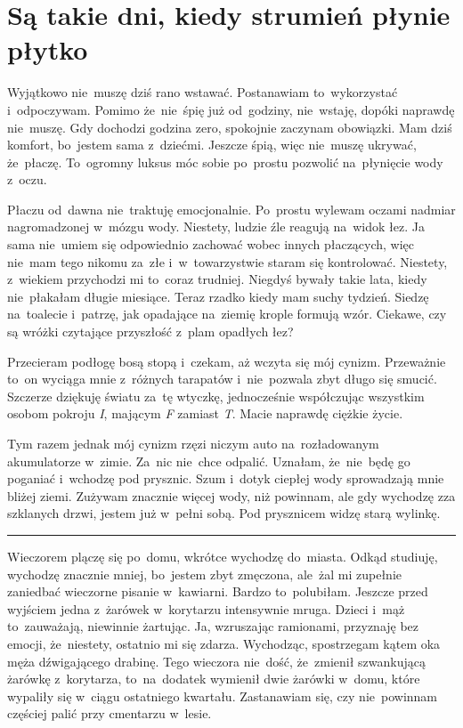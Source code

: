 \documentclass[9pt, a5paper]{memoir}
\begin{document}
\newpage
\section{Są takie dni, kiedy strumień płynie płytko}
Wyjątkowo nie~muszę dziś rano wstawać. Postanawiam to~wykorzystać i~odpoczywam. Pomimo że~nie~śpię już od~godziny, nie~wstaję, dopóki naprawdę nie~muszę. Gdy dochodzi godzina zero, spokojnie zaczynam obowiązki. Mam dziś komfort, bo~jestem sama z~dziećmi. Jeszcze śpią, więc nie~muszę ukrywać, że~płaczę. To~ogromny luksus móc sobie po~prostu pozwolić na~płynięcie wody z~oczu.

Płaczu od~dawna nie~traktuję emocjonalnie. Po~prostu wylewam oczami nadmiar nagromadzonej w~mózgu wody. Niestety, ludzie źle reagują na~widok łez. Ja sama nie~umiem się odpowiednio zachować wobec innych płaczących, więc nie~mam tego nikomu za~złe i~w~towarzystwie staram się kontrolować. Niestety, z~wiekiem przychodzi mi to~coraz trudniej. Niegdyś bywały takie lata, kiedy nie~płakałam długie miesiące. Teraz rzadko kiedy mam suchy tydzień.
Siedzę na~toalecie i~patrzę, jak opadające na~ziemię krople formują wzór. Ciekawe, czy są wróżki czytające przyszłość z~plam opadłych łez?

Przecieram podłogę bosą stopą i~czekam, aż wczyta się mój cynizm. Przeważnie to~on wyciąga mnie z~różnych tarapatów i~nie~pozwala zbyt długo się smucić. Szczerze dziękuję światu za~tę wtyczkę, jednocześnie współczując wszystkim osobom pokroju \textit{I}, mającym \textit{F} zamiast \textit{T}. Macie naprawdę ciężkie życie.

Tym razem jednak mój cynizm rzęzi niczym auto na~rozładowanym akumulatorze w~zimie. Za~nic nie~chce odpalić. Uznałam, że~nie~będę go poganiać i~wchodzę pod prysznic. Szum i~dotyk ciepłej wody sprowadzają mnie bliżej ziemi. Zużywam znacznie więcej wody, niż powinnam, ale gdy wychodzę zza szklanych drzwi, jestem już w~pełni sobą. Pod prysznicem widzę starą wylinkę.

\fancybreak{* \quad * \quad *}

Wieczorem plączę się po~domu, wkrótce wychodzę do~miasta. Odkąd studiuję, wychodzę znacznie mniej, bo~jestem zbyt zmęczona, ale~żal mi zupełnie zaniedbać wieczorne pisanie w~kawiarni. Bardzo to~polubiłam. Jeszcze przed wyjściem jedna z~żarówek w~korytarzu intensywnie mruga. Dzieci i~mąż to~zauważają, niewinnie żartując. Ja, wzruszając ramionami, przyznaję bez emocji, że~niestety, ostatnio mi się zdarza. Wychodząc, spostrzegam kątem oka męża dźwigającego drabinę. Tego wieczora nie~dość, że~zmienił szwankującą żarówkę z~korytarza, to~na~dodatek wymienił dwie żarówki w~domu, które wypaliły się w~ciągu ostatniego kwartału. Zastanawiam się, czy nie~powinnam częściej palić przy cmentarzu w~lesie.
\end{document}
